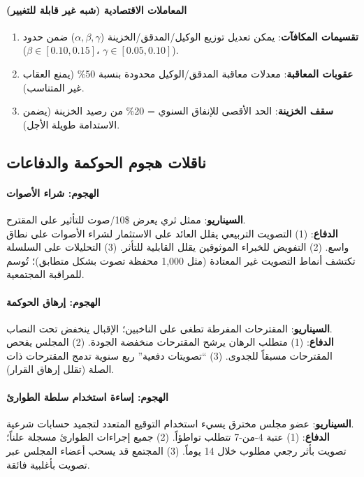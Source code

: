 \documentclass[11pt]{article}
\begin{document}
\paragraph{المعاملات الاقتصادية (شبه غير قابلة للتغيير)}
\begin{enumerate}[noitemsep]
  \item \textbf{تقسيمات المكافآت}: يمكن تعديل توزيع الوكيل/المدقق/الخزينة ($\alpha, \beta, \gamma$) ضمن حدود ($\beta \in [0.10, 0.15]$، $\gamma \in [0.05, 0.10]$).
  \item \textbf{عقوبات المعاقبة}: معدلات معاقبة المدقق/الوكيل محدودة بنسبة 50\% (يمنع العقاب غير المتناسب).
  \item \textbf{سقف الخزينة}: الحد الأقصى للإنفاق السنوي = 20\% من رصيد الخزينة (يضمن الاستدامة طويلة الأجل).
\end{enumerate}

\subsection{ناقلات هجوم الحوكمة والدفاعات}

\paragraph{الهجوم: شراء الأصوات}
\textbf{السيناريو}: ممثل ثري يعرض \$10/صوت للتأثير على المقترح.\\
\textbf{الدفاع}: (1) التصويت التربيعي يقلل العائد على الاستثمار لشراء الأصوات على نطاق واسع. (2) التفويض للخبراء الموثوقين يقلل القابلية للتأثر. (3) التحليلات على السلسلة تكتشف أنماط التصويت غير المعتادة (مثل 1,000 محفظة تصوت بشكل متطابق)؛ تُوسم للمراقبة المجتمعية.

\paragraph{الهجوم: إرهاق الحوكمة}
\textbf{السيناريو}: المقترحات المفرطة تطغى على الناخبين؛ الإقبال ينخفض تحت النصاب.\\
\textbf{الدفاع}: (1) متطلب الرهان يرشح المقترحات منخفضة الجودة. (2) المجلس يفحص المقترحات مسبقاً للجدوى. (3) ``تصويتات دفعية'' ربع سنوية تدمج المقترحات ذات الصلة (تقلل إرهاق القرار).

\paragraph{الهجوم: إساءة استخدام سلطة الطوارئ}
\textbf{السيناريو}: عضو مجلس مخترق يسيء استخدام التوقيع المتعدد لتجميد حسابات شرعية.\\
\textbf{الدفاع}: (1) عتبة 4-من-7 تتطلب تواطؤاً. (2) جميع إجراءات الطوارئ مسجلة علناً؛ تصويت بأثر رجعي مطلوب خلال 14 يوماً. (3) المجتمع قد يسحب أعضاء المجلس عبر تصويت بأغلبية فائقة.
\end{document}
